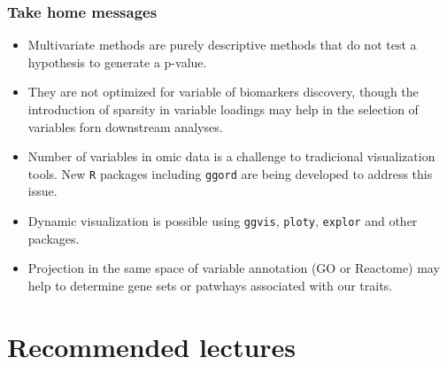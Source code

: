 \documentclass[10pt,xcolor=dvipsnames]{beamer}\usepackage[]{graphicx}\usepackage[]{color}
\begin{document}
\begin{frame}[plain]\frametitle{Take home messages}
\begin{itemize}
  \item Multivariate methods are purely descriptive methods that do not test a hypothesis to generate a p-value.
  \item They are not optimized for variable of biomarkers discovery, though the introduction of sparsity in variable loadings may help in the selection of variables forn downstream analyses.
  \item Number of variables in omic data is a challenge to tradicional visualization tools. New {\tt R} packages including {\tt ggord} are being developed to address this issue.
  \item Dynamic visualization is possible using {\tt ggvis}, {\tt ploty}, {\tt explor} and other packages.
  \item Projection in the same space of variable annotation (GO or Reactome) may help to determine gene sets or patwhays associated with our traits.

\end{itemize}
\end{frame}


\section{Recommended lectures}
\end{document}
